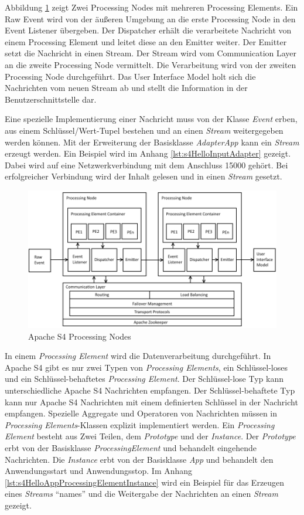 Abbildung \ref{fig:s4ProcessingNode} zeigt Zwei Processing Nodes mit mehreren Processing Elements. Ein Raw Event wird von der äußeren Umgebung an die erste Processing Node in den Event Listener übergeben. Der Dispatcher erhält die verarbeitete Nachricht von einem Processing Element und leitet diese an den Emitter weiter. Der Emitter setzt die Nachricht in einen Stream. Der Stream wird vom Communication Layer an die zweite Processing Node vermittelt. Die Verarbeitung wird von der zweiten Processing Node durchgeführt. Das User Interface Model holt sich die Nachrichten vom neuen Stream ab und stellt die Information in der Benutzerschnittstelle dar.

Eine spezielle Implementierung einer Nachricht muss von der Klasse \textit{Event} erben, aus einem Schlüssel/Wert-Tupel bestehen und an einen \textit{Stream} weitergegeben werden können. Mit der Erweiterung der Basisklasse \textit{AdapterApp} kann ein \textit{Stream} erzeugt werden. Ein Beispiel wird im Anhang \ref{lst:s4HelloInputAdapter} gezeigt. Dabei wird auf eine Netzwerkverbindung mit dem Anschluss 15000 gehört. Bei erfolgreicher Verbindung wird der Inhalt gelesen und in einen \textit{Stream} gesetzt. 

\begin{figure}[htb!]
\centering
\includegraphics[width=1.0\textwidth]{bilder/s4ProcessingNodes.png}
\caption{Apache S4 Processing Nodes
\label{fig:s4ProcessingNode}}
\end{figure}

In einem \textit{Processing Element} wird die Datenverarbeitung durchgeführt. In Apache S4 gibt es nur zwei Typen von \textit{Processing Elements}, ein Schlüssel-loses und ein Schlüssel-behaftetes \textit{Processing Element}. Der Schlüssel-lose Typ kann unterschiedliche Apache S4 Nachrichten empfangen. Der Schlüssel-behaftete Typ kann nur Apache S4 Nachrichten mit einem definierten Schlüssel in der Nachricht empfangen. Spezielle Aggregate und Operatoren von Nachrichten müssen in \textit{Processing Elements}-Klassen explizit implementiert werden. Ein \textit{Processing Element} besteht aus Zwei Teilen, dem \textit{Prototype} und der \textit{Instance}. Der \textit{Prototype} erbt von der Basisklasse \textit{ProcessingElement} und behandelt eingehende Nachrichten. Die \textit{Instance} erbt von der Basisklasse \textit{App} und behandelt den Anwendungsstart und Anwendungsstop. Im Anhang \ref{lst:s4HelloAppProcessingElementInstance} wird ein Beispiel für das Erzeugen eines \textit{Streams} "`names"' und die Weitergabe der Nachrichten an einen \textit{Stream} gezeigt. 

